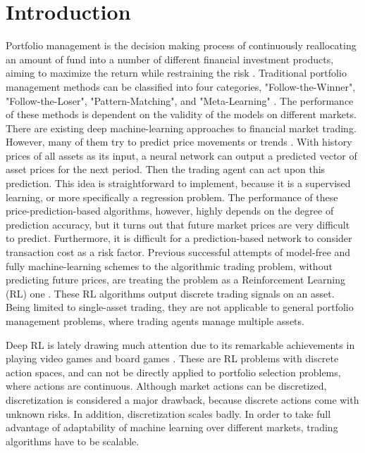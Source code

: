 \documentclass[journal,onecolumn]{IEEEtran}
\begin{document}
\section{Introduction}
Portfolio management is the decision making process of continuously reallocating an amount of fund into a number of different financial investment products, aiming to maximize the return while restraining the risk \cite{Shapira2009}. Traditional portfolio management methods can be classified into four categories, "Follow-the-Winner", "Follow-the-Loser", "Pattern-Matching", and "Meta-Learning" \cite{Li2014}. The performance of these methods is dependent on the validity of the models on different markets.
There are existing deep machine-learning approaches to financial market trading. However, many of them try to predict price movements or trends \cite{Heaton2017}\cite{Freitas2009}. With history prices of all assets as its input, a neural network can output a predicted vector of asset prices for the next period. Then the trading agent
can act upon this prediction. This idea is straightforward to implement, because it is a supervised learning, or more specifically a regression problem. The performance of these
price-prediction-based algorithms, however, highly depends on the degree of prediction accuracy, but it turns out that future market prices are very difficult to predict. Furthermore, it is difficult for a prediction-based network to consider transaction cost as a risk factor.
Previous successful attempts of model-free and fully machine-learning schemes to the algorithmic trading problem, without predicting future prices, are treating the problem as a Reinforcement Learning (RL) one \cite{Moody2001}\cite{Dempster2006}\cite{Deng2017}. These
RL algorithms output discrete trading signals on an asset. Being limited to single-asset trading, they are not applicable to general portfolio management problems, where trading agents manage multiple assets.


Deep RL is lately drawing much attention due to its remarkable achievements in playing video games and board games \cite{Silver2014}. These are RL
problems with discrete action spaces, and can not be directly applied to portfolio selection problems, where actions are continuous. Although market actions can be discretized, discretization is considered a major drawback, because discrete actions come with unknown risks. In addition, discretization scales badly. In order to take full advantage of adaptability of machine learning over different
markets, trading algorithms have to be scalable.
\end{document}
